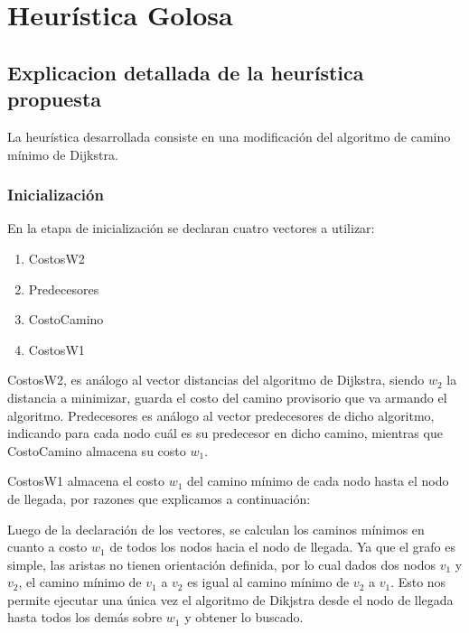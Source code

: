 \section{Heur\'istica Golosa}
\subsection{Explicacion detallada de la heur\'istica propuesta}

La heur\'istica desarrollada consiste en una modificaci\'on del algoritmo de camino m\'inimo de Dijkstra.

\subsubsection{Inicializaci\'on}

En la etapa de inicializaci\'on se declaran cuatro vectores a utilizar:

\begin{enumerate}

\item CostosW2
\item Predecesores
\item CostoCamino
\item CostosW1
\end{enumerate}

CostosW2, es an\'alogo al vector distancias del algoritmo de Dijkstra, siendo $w_2$ la distancia a minimizar, guarda el costo del camino provisorio que va armando el algoritmo. Predecesores es an\'alogo al vector predecesores de dicho algoritmo, indicando para cada nodo cu\'al es su predecesor en dicho camino, mientras que CostoCamino almacena su costo $w_1$.

\vspace{2mm}

CostosW1 almacena el costo $w_1$ del camino m\'inimo de cada nodo hasta el nodo de llegada, por razones que explicamos a continuaci\'on:

\vspace{2mm}

Luego de la declaraci\'on de los vectores, se calculan los caminos m\'inimos en cuanto a costo $w_1$ de todos los nodos hacia el nodo de llegada. Ya que el grafo es simple, las aristas no tienen orientaci\'on definida, por lo cual dados dos nodos $v_1$ y $v_2$, el camino m\'inimo de $v_1$ a $v_2$ es igual al camino m\'inimo de $v_2$ a $v_1$. Esto nos permite ejecutar una \'unica vez el algoritmo de Dikjstra desde el nodo de llegada hasta todos los dem\'as sobre $w_1$ y obtener lo buscado.

